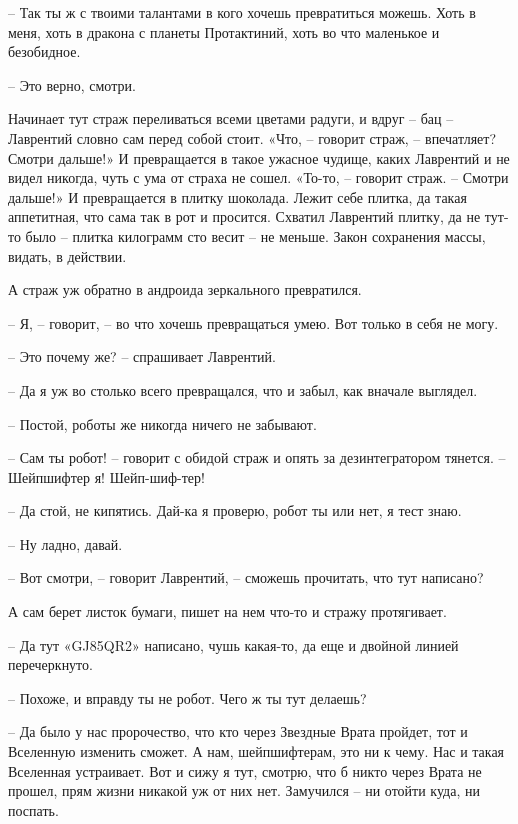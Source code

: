 \documentclass[ebook,oneside,final,openright]{memoir}
\begin{document}
– Так ты ж с твоими талантами в кого хочешь превратиться можешь. Хоть в меня, хоть в дракона с планеты Протактиний, хоть во что маленькое и безобидное. \par
– Это верно, смотри. \par
\par
Начинает тут страж переливаться всеми цветами радуги, и вдруг – бац – Лаврентий словно сам перед собой стоит. «Что, – говорит страж, – впечатляет? Смотри дальше!» И превращается в такое ужасное чудище, каких Лаврентий и не видел никогда, чуть с ума от страха не сошел. «То-то, – говорит страж. – Смотри дальше!» И превращается в плитку шоколада. Лежит себе плитка, да такая аппетитная, что сама так в рот и просится. Схватил Лаврентий плитку, да не тут-то было – плитка килограмм сто весит – не меньше. Закон сохранения массы, видать, в действии. \par
\par
А страж уж обратно в андроида зеркального превратился. \par
– Я, – говорит, – во что хочешь превращаться умею. Вот только в себя не могу. \par
– Это почему же? – спрашивает Лаврентий.\par
– Да я уж во столько всего превращался, что и забыл, как вначале выглядел. \par
– Постой, роботы же никогда ничего не забывают. \par
– Сам ты робот! – говорит с обидой страж и опять за дезинтегратором тянется. – Шейпшифтер я! Шейп-шиф-тер! \par
– Да стой, не кипятись. Дай-ка я проверю, робот ты или нет, я тест знаю. \par
– Ну ладно, давай. \par
– Вот смотри, – говорит Лаврентий, – сможешь прочитать, что тут написано? \par
А сам берет листок бумаги, пишет на нем что-то и стражу протягивает. \par
– Да тут «GJ85QR2» написано, чушь какая-то, да еще и двойной линией перечеркнуто.\par
– Похоже, и вправду ты не робот. Чего ж ты тут делаешь? \par
– Да было у нас пророчество, что кто через Звездные Врата пройдет, тот и Вселенную изменить сможет. А нам, шейпшифтерам, это ни к чему. Нас и такая Вселенная устраивает. Вот и сижу я тут, смотрю, что б никто через Врата не прошел, прям жизни никакой уж от них нет. Замучился – ни отойти куда, ни поспать. \par
\end{document}
